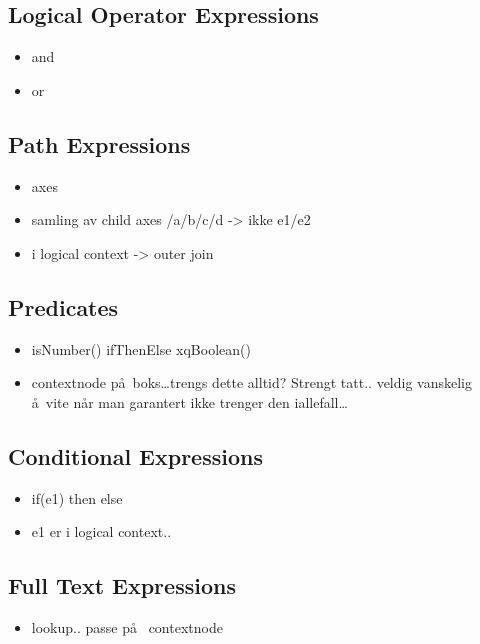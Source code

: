 \subsection{Logical Operator Expressions}
\label{sect:trans:TD:logical}
\begin{itemize}
  \item and
  \item or
\end{itemize}

\subsection{Path Expressions}
\label{sect:trans:TD:pathExprs}
\begin{itemize}
  \item axes
  \item samling av child axes /a/b/c/d -> ikke e1/e2
  \item i logical context -> outer join
\end{itemize}

\subsection{Predicates}
\label{sect:trans:TD:predicates}
\begin{itemize}
  \item isNumber() ifThenElse xqBoolean()
  \item contextnode p\aa~boks\ldots trengs dette alltid? Strengt tatt.. veldig vanskelig \aa~vite n\aa r man
  garantert ikke trenger den iallefall\ldots
\end{itemize}

\subsection{Conditional Expressions}
\label{sect:trans:TD:ifThenElse}
\begin{itemize}
  \item if(e1) then else
  \item e1 er i logical context..
\end{itemize}

\subsection{Full Text Expressions}
\label{sect:trans:TD:fulltext}
\begin{itemize}
  \item lookup.. passe p\aa~ contextnode
\end{itemize}


